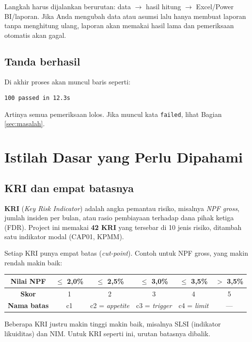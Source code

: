 \documentclass[11pt,a4paper]{article}
\begin{document}
\begin{warnbox}
Langkah harus dijalankan berurutan: data $\rightarrow$ hasil hitung $\rightarrow$ Excel/Power BI/laporan. Jika Anda mengubah data atau asumsi lalu hanya membuat laporan tanpa menghitung ulang, laporan akan memakai hasil lama dan pemeriksaan otomatis akan gagal.
\end{warnbox}

\subsection{Tanda berhasil}

Di akhir proses akan muncul baris seperti:
\begin{lstlisting}
100 passed in 12.3s
\end{lstlisting}
Artinya semua pemeriksaan lolos. Jika muncul kata \texttt{failed}, lihat Bagian \ref{sec:masalah}.
\section{Istilah Dasar yang Perlu Dipahami}\label{sec:istilah}

\subsection{KRI dan empat batasnya}

\textbf{KRI} (\emph{Key Risk Indicator}) adalah angka pemantau risiko, misalnya \emph{NPF gross}, jumlah insiden per bulan, atau rasio pembiayaan terhadap dana pihak ketiga (FDR). Project ini memakai \textbf{42 KRI} yang tersebar di 10 jenis risiko, ditambah satu indikator modal (CAP01, KPMM).

Setiap KRI punya empat batas (\emph{cut-point}). Contoh untuk NPF gross, yang makin rendah makin baik:

\begin{center}
\begin{tabular}{cccccc}
\toprule
\textbf{Nilai NPF} & $\leq$ 2{,}0\% & $\leq$ 2{,}5\% & $\leq$ 3{,}0\% & $\leq$ 3{,}5\% & $>$ 3{,}5\% \\
\midrule
\textbf{Skor} & 1 & 2 & 3 & 4 & 5 \\
\textbf{Nama batas} & c1 & c2 = \emph{appetite} & c3 = \emph{trigger} & c4 = \emph{limit} & --- \\
\bottomrule
\end{tabular}
\end{center}

Beberapa KRI justru makin tinggi makin baik, misalnya SLSI (indikator likuiditas) dan NIM. Untuk KRI seperti ini, urutan batasnya dibalik.
\end{document}
